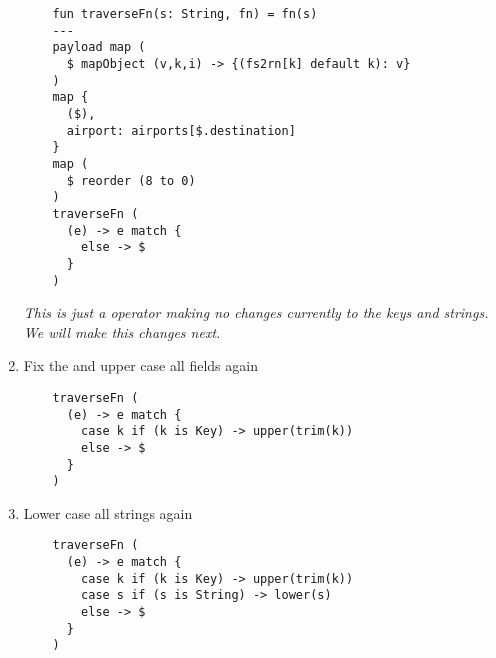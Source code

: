 \begin{enumerate}[resume*]
\begin{verbatim}
    fun traverseFn(s: String, fn) = fn(s)
    ---
    payload map (
      $ mapObject (v,k,i) -> {(fs2rn[k] default k): v}
    )
    map {
      ($),
      airport: airports[$.destination]
    }
    map (
      $ reorder (8 to 0)
    )
    traverseFn (
      (e) -> e match {
        else -> $
      }
    )
  \end{verbatim}
  \emph{
    This \les{} is just a  operator making no changes currently to the keys and strings.  We will make this changes next.
  }
\item Fix the  and upper case all fields again
  \begin{verbatim}
    traverseFn (
      (e) -> e match {
        case k if (k is Key) -> upper(trim(k))
        else -> $
      }
    )
  \end{verbatim}
\item Lower case all strings again
  \begin{verbatim}
    traverseFn (
      (e) -> e match {
        case k if (k is Key) -> upper(trim(k))
        case s if (s is String) -> lower(s)
        else -> $
      }
    )    
  \end{verbatim}
\end{enumerate}

